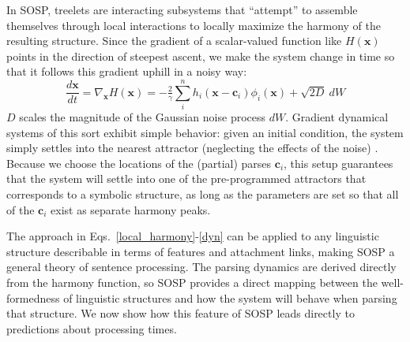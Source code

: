 \documentclass[10pt,letterpaper]{article}
\begin{document}
In SOSP, treelets are interacting subsystems that ``attempt'' to assemble themselves through local interactions to locally maximize the harmony of the resulting structure. Since the gradient of a scalar-valued function like $H(\mathbf{x})$ points in the direction of steepest ascent, we make the system change in time so that it follows this gradient uphill in a noisy way:
\begin{equation}\label{dyn}
\frac{d\mathbf{x}}{dt} = \nabla_\mathbf{x} H(\mathbf{x}) = -\tfrac{2}{\gamma} \sum_{i}^{n} h_i (\mathbf{x} - \mathbf{c}_i) \phi_i(\mathbf{x}) + \sqrt{2D}\ dW
\end{equation}
$D$ scales the magnitude of the Gaussian noise process $dW$. Gradient dynamical systems of this sort exhibit simple behavior: given an initial condition, the system simply settles into the nearest attractor (neglecting the effects of the noise) \cite{hirsch1974differential}. Because we choose the locations of the (partial) parses $\mathbf{c}_i$, this setup guarantees that the system will settle into one of the pre-programmed attractors that corresponds to a symbolic structure, as long as the parameters are set so that all of the $\mathbf{c}_i$ exist as separate harmony peaks. %

The approach in Eqs.~\ref{local_harmony}-\ref{dyn} can be applied to any linguistic structure describable in terms of features and attachment links, making SOSP a general theory of sentence processing. The parsing dynamics are derived directly from the harmony function, so SOSP provides a direct mapping between the well-formedness of linguistic structures and how the system will behave when parsing that structure. We now show how this feature of SOSP leads directly to predictions about processing times.
\end{document}
